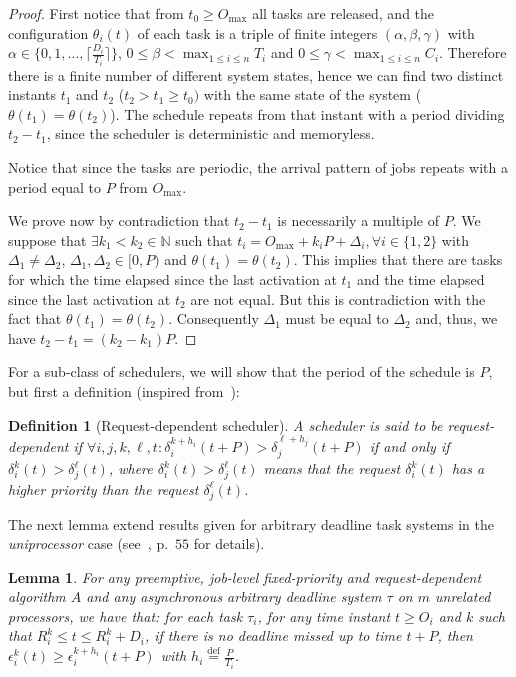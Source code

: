 \documentclass[a4paper,11pt]{article}
\newtheorem{Definition}{Definition}
\newtheorem{Lemma}[Theorem]{Lemma}
\newcommand{\equals}{\stackrel{\mathrm{def}}{=}}
\newcommand{\maxm}{\mathrm{max}}
\begin{document}
\begin{proof}
  First notice that from $t_0 \geq O_{\max}$ all tasks are released,
  and the configuration $\theta_i(t)$ of each task is a triple of
  finite integers $(\alpha, \beta, \gamma)$ with $ \alpha \in \{0,1, \ldots, \lceil \frac{D_i}{T_i} \rceil \}$, $0 \leq \beta < \max_{1 \leq i
    \leq n}T_i$ and $0 \leq \gamma < \max_{1 \leq i \leq
    n}C_i$. Therefore there is a finite number of different system
  states, hence we can find two distinct instants $t_1$ and $t_2$
  ($t_{2} > t_1 \geq t_0)$ with the same state of the system
  ($\theta(t_1)=\theta(t_2)$). The schedule repeats from that instant
  with a period dividing $t_2-t_1$, since the scheduler is
  deterministic and memoryless.
  
  Notice that since the tasks are periodic, the arrival pattern of jobs repeats with a period equal to $P$ from $O_{\maxm}$.

  We prove now by contradiction that $t_2-t_1$ is necessarily a multiple
  of $P$. We suppose that $\exists k_1 < k_2 \in \mathbb{N}$ such
  that $t_i= O_{\maxm}+k_iP+ \Delta_i, \forall i \in \{1,2 \}$ with
  $\Delta_1 \neq \Delta_2$, $\Delta_1, \Delta_2 \in [0,P)$ and $\theta(t_1)=\theta(t_2)$. This implies that there are tasks for which the time elapsed since the last activation at $t_1$ and the time elapsed since the last
  activation at $t_2$ are not equal. But this is contradiction with the fact that $\theta(t_1)=\theta(t_2)$. Consequently $\Delta_1$ must be equal to
  $\Delta_2$ and, thus, we have $t_2-t_1 = (k_2 - k_1)P$. 
\end{proof}

For a sub-class of schedulers, we will show that the period of the schedule is $P$, but first a definition (inspired from~\cite{GD99b}):

\begin{Definition}[Request-dependent scheduler]
A scheduler is said to be \emph{request-dependent} if $\forall i,j,k,\ell, t: \delta_{i}^{k+h_{i}}(t+P) > \delta_{j}^{\ell + h_{j}}(t+P)$ if and  only if $\delta_{i}^{k}(t) > \delta_{j}^{\ell }(t)$, where $\delta_{i}^{k}(t) > \delta_{j}^{\ell }(t)$ means that the request $\delta_{i}^{k}(t)$ has a higher priority than the request $\delta_{j}^{\ell }(t)$.
\end{Definition}

The next lemma extend results given for arbitrary
deadline task systems in the \emph{uniprocessor} case
(see~\cite{thesisJG}, p.~$55$ for details).

\begin{Lemma} \label{prepTh} For any preemptive, job-level fixed-priority and request-dependent algorithm $A$ and any asynchronous arbitrary deadline system $\tau$ on $m$ unrelated processors, we have that:
  for each task $\tau_i$, for any time instant $t \geq O_i$ and $k$
  such that $R_i^k \leq t \leq R_i^k+D_i$, if there is no deadline
  missed up to time $t+P$, then $\epsilon_{i}^{k}(t) \geq
  \epsilon_{i}^{k+h_i}(t+P)$ with $h_i \equals \frac{P}{T_i}$.
\end{Lemma}
\end{document}
